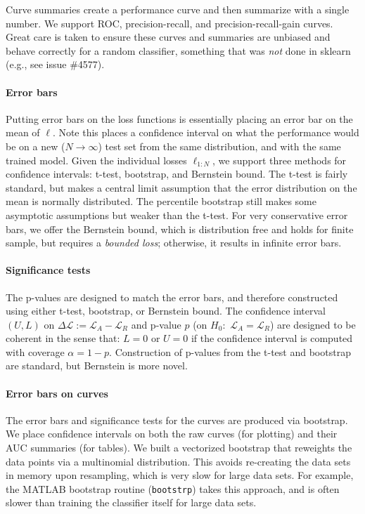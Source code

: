 \documentclass[a0,landscape]{a0poster}
\newcommand{\Loss}{\mathcal{L}}
\newcommand{\loss}{\ell}
\newcommand{\code}{\texttt}
\newcommand{\sectionx}{\paragraph}
\begin{document}
\begin{multicols}{3}
Curve summaries create a performance curve and then summarize with a single number.
We support ROC, precision-recall, and precision-recall-gain curves.
Great care is taken to ensure these curves and summaries are unbiased and behave correctly for a random classifier, something that was \emph{not} done in sklearn (e.g., see issue \#4577)\@.

\sectionx{Error bars}
Putting error bars on the loss functions is essentially placing an error bar on the mean of $\loss$.
Note this places a confidence interval on what the performance would be on a new ($N \rightarrow \infty$) test set from the same distribution, and with the same trained model.
Given the individual losses $\loss_{1:N}$, we support three methods for confidence intervals: t-test, bootstrap, and Bernstein bound.
The t-test is fairly standard, but makes a central limit assumption that the error distribution on the mean is normally distributed.
The percentile bootstrap still makes some asymptotic assumptions but weaker than the t-test.
For very conservative error bars, we offer the Bernstein bound, which is distribution free and holds for finite sample, but requires a \emph{bounded loss}; otherwise, it results in infinite error bars.


\paragraph{Significance tests}
The p-values are designed to match the error bars, and therefore constructed using either t-test, bootstrap, or Bernstein bound.
The confidence interval $(U,L)$ on $\Delta \Loss := \Loss_A - \Loss_R$ and p-value $p$ (on $H_0$:~$\Loss_A = \Loss_R$) are designed to be coherent in the sense that: $L = 0$ or $U = 0$ if the confidence interval is computed with coverage $\alpha=1-p$.
Construction of p-values from the t-test and bootstrap are standard, but Bernstein is more novel.

\paragraph{Error bars on curves}
The error bars and significance tests for the curves are produced via bootstrap.
We place confidence intervals on both the raw curves (for plotting) and their AUC summaries (for tables)\@.
We built a vectorized bootstrap that reweights the data points via a multinomial distribution.
This avoids re-creating the data sets in memory upon resampling, which is very slow for large data sets.
For example, the MATLAB bootstrap routine (\code{bootstrp}) takes this approach, and is often slower than training the classifier itself for large data sets.

\end{multicols}
\end{document}
